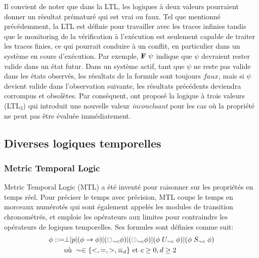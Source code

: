 Il convient de noter que dans la LTL, les logiques à deux valeurs pourraient donner un résultat prématuré qui est vrai ou faux. Tel que mentionné précédemment, la LTL est définie pour travailler avec les traces infinies tandis que le monitoring de la vérification à l'exécution est seulement capable de traiter les traces finies, ce qui pourrait conduire à un conflit, en particulier dans un système en cours d'exécution. Par exemple, $\mathop{\mbox{\textbf{F}}}\, \psi$ indique que $\psi$ devraient rester valide dans un état futur. Dans un système actif, tant que $\psi$ ne reste pas valide dans les états observés, les résultats de la formule sont toujours $faux$, mais si $\psi$ devient valide dans l'observation suivante, les résultats précédents deviendra corrompus et obsolètes. Par conséquent, \cite{bauer2006monitoring} ont proposé la logique à trois valeurs (LTL$_3$) qui introduit une nouvelle valeur \emph{inconcluant} pour les cas où la propriété ne peut pas être évaluée immédiatement.

\subsection{Diverses logiques temporelles}

\subsubsection{Metric Temporal Logic}

Metric Temporal Logic (MTL) \citep{chang1994compositional} a été inventé pour raisonner sur les propriétés en temps réel. Pour préciser le temps avec précision, MTL coupe le temps en morceaux numérotés qui sont également appelés les modules de transition chronométrés, et emploie les opérateurs aux limites pour contraindre les opérateurs de logiques temporelles. Ses formules sont définies comme suit:
\begin{align*}
\phi ::= & \bot | p | (\phi \rightarrow \phi) | (\fullmoon_{\sim{}c}\phi) | (\circleddash_{\sim{}c}\phi) | (\phi \mathrel{U}_{\sim{}c} \phi) | (\phi \mathrel{S}_{\sim{}c} \phi) \\
& \mbox{où } \sim \in \{<, =, >, \equiv_d\} \mbox{ et } c \geq 0, d \geq 2
\end{align*}

